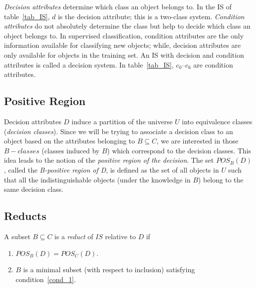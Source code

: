 \documentclass[authoryear,preprint,review,12pt]{elsarticle}
\begin{document}
  \textit{Decision attributes} determine which class an object belongs to. In the IS of table~\ref{tab_IS}, $d$ is the decision attribute; this is a two-class system. \textit{Condition attributes} do not absolutely determine the class but help to decide which class an object belongs to. In supervised classification, condition attributes are the only information available for classifying new objects; while, decision attributes are only available for objects in the training set. An IS with decision and condition attributes is called a decision system. In table~\ref{tab_IS}, $c_0$--$c_6$ are condition attributes.
  
\subsection{Positive Region}\label{subsect_Pos}
  Decision attributes $D$ induce a partition of the universe $U$ into equivalence classes (\textit{decision classes}). Since we will be trying to associate a decision class to an object based on the attributes belonging to $B \subseteq C$, we are interested in those $B-classes$ (classes induced by $B$) which correspond to the decision classes. This idea leads to the notion of the  \textit{positive region of the decision}. The set $POS_B(D)$, called the \textit{B-positive region of D}, is defined as the set of all objects in $U$ such that all the indistinguishable objects (under the knowledge in $B$) belong to the same decision class.
%  
%  
 
\subsection{Reducts}\label{def_reduct}
  A subset $B \subseteq C$ is a \textit{reduct} of $IS$ relative to $D$ if
  \begin{enumerate}
  	\item $POS_B(D)=POS_C(D)$. \label{cond_1}
  	\item $B$ is a minimal subset (with respect to inclusion) satisfying condition~\ref{cond_1}.\label{cond_2}
  \end{enumerate}
\end{document}
